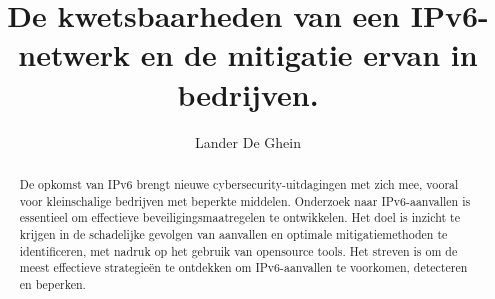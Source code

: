 \documentclass[a0,portrait]{hogent-poster}
\title{De kwetsbaarheden van een IPv6-
    netwerk en de mitigatie ervan in
    bedrijven.}
\subtitle{}
\author{Lander De Ghein}
\begin{document}
\maketitle

\begin{abstract}

De opkomst van IPv6 brengt nieuwe cybersecurity-uitdagingen met zich mee, vooral voor kleinschalige bedrijven met beperkte middelen. Onderzoek naar IPv6-aanvallen is essentieel om effectieve beveiligingsmaatregelen te ontwikkelen. Het doel is inzicht te krijgen in de schadelijke gevolgen van aanvallen en optimale mitigatiemethoden te identificeren, met nadruk op het gebruik van opensource tools. Het streven is om de meest effectieve strategieën te ontdekken om IPv6-aanvallen te voorkomen, detecteren en beperken.
\end{abstract}
\end{document}
